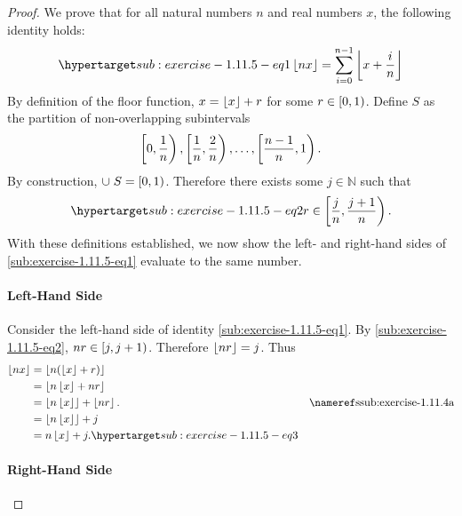 \documentclass{report}
\begin{document}
  \begin{proof}

    We prove that for all natural numbers $n$ and real numbers $x$, the
      following identity holds:
      \begin{equation}
        \hyperlabel{sub:exercise-1.11.5-eq1}
        \floor{nx} = \sum_{i=0}^{n-1} \floor{x + \frac{i}{n}}
      \end{equation}
    By definition of the floor function, $x = \left\lfloor x\right\rfloor + r$ for some
      $r \in \left[0, 1\right)$.
    Define $S$ as the partition of non-overlapping subintervals
      $$\left[0, \frac{1}{n}\right), \left[\frac{1}{n}, \frac{2}{n}\right), \ldots,
        \left[\frac{n-1}{n}, 1\right).$$
    By construction, $\cup\; S = \left[0, 1\right)$.
    Therefore there exists some $j \in \mathbb{N}$ such that
      \begin{equation}
        \hyperlabel{sub:exercise-1.11.5-eq2}
        r \in \ico{\frac{j}{n}}{\frac{j+1}{n}}.
      \end{equation}
    With these definitions established, we now show the left- and right-hand
      sides of \eqref{sub:exercise-1.11.5-eq1} evaluate to the same number.

    \paragraph{Left-Hand Side}%

      Consider the left-hand side of identity \eqref{sub:exercise-1.11.5-eq1}.
      By \eqref{sub:exercise-1.11.5-eq2}, $nr \in \left[j, j + 1\right)$.
      Therefore $\left\lfloor nr\right\rfloor = j$.
      Thus
        \begin{align}
          \floor{nx}
            & = \floor{n(\floor{x} + r)} \nonumber \\
            & = \floor{n\floor{x} + nr} \nonumber \\
            & = \floor{n\floor{x}} + \floor{nr}. \nonumber
              & \textref{ssub:exercise-1.11.4a} \\
            & = \floor{n\floor{x}} + j \nonumber \\
            & = n\floor{x} + j. \hyperlabel{sub:exercise-1.11.5-eq3}
        \end{align}

    \paragraph{Right-Hand Side}%


\end{proof}
\end{document}
